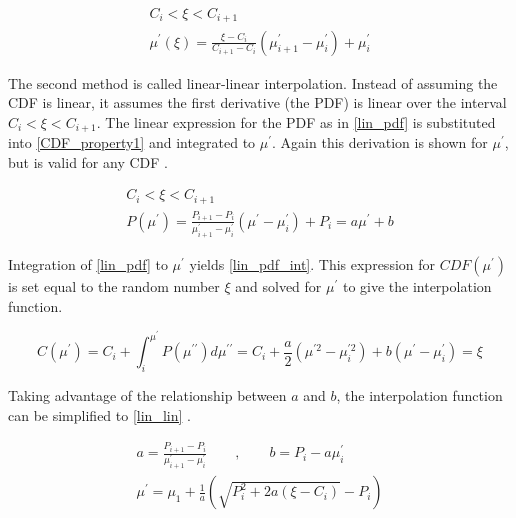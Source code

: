  \begin{equation}
\label{histo_interp}
\begin{gathered}
C_i < \xi < C_{i+1} \\
 \mu^\prime(\xi) = \frac{\xi-C_i}{C_{i+1}-C_i}(\mu^\prime_{i+1}-\mu^\prime_i) + \mu^\prime_i
\end{gathered}
\end{equation}

The second method is called linear-linear interpolation.  Instead of assuming the CDF is linear, it assumes the first derivative (the PDF) is linear over the interval $C_i < \xi < C_{i+1}$.  The linear expression for the PDF as in \eqref{lin_pdf} is substituted into \eqref{CDF_property1} and integrated to $\mu^\prime$.  Again this derivation is shown for $\mu^\prime$, but is valid for any CDF \cite{openmc}.

\begin{equation}
\label{lin_pdf}
\begin{gathered}
C_i < \xi < C_{i+1} \\
P(\mu^\prime) = \frac{P_{i+1}-P_i}{\mu^\prime_{i+1}-\mu^\prime_i}(\mu^\prime - \mu^\prime_i) + P_i = a \mu^\prime + b
\end{gathered}
\end{equation}

Integration of \eqref{lin_pdf} to $\mu^\prime$ yields \eqref{lin_pdf_int}.  This expression for $CDF(\mu^\prime)$ is set equal to the random number $\xi$ and solved for $\mu^\prime$ to give the interpolation function.

\begin{equation}
\label{lin_pdf_int}
C(\mu^\prime) = C_i  + \int_i^{\mu^\prime} P(\mu^{\prime\prime}) d\mu^{\prime\prime}  = C_i  + \frac{a}{2}(\mu^{\prime 2}-\mu^{\prime 2}_i) + b(\mu^\prime-\mu^\prime_i) = \xi 
\end{equation}

Taking advantage of the relationship between $a$ and $b$, the interpolation function can be simplified to \eqref{lin_lin} \cite{openmc}.

\begin{equation}
\label{lin_lin}
\begin{gathered}
a = \frac{P_{i+1}-P_i}{\mu^\prime_{i+1}-\mu^\prime_i} \qquad , \qquad b = P_i - a \mu^\prime_i \\
\mu^\prime = \mu_1 + \frac{1}{a}\left( \sqrt{P^2_i + 2a(\xi -C_i)} -P_i \right)
\end{gathered}
\end{equation}

